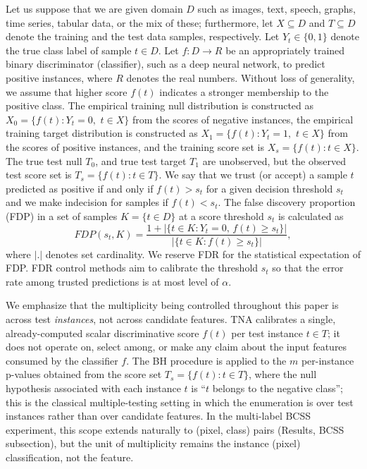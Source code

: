 \documentclass[10pt,letterpaper]{article}
\begin{document}
Let us suppose that we are given domain $D$ such as images, text, speech, graphs, time series, tabular data, or the mix of these; furthermore, let $X\subseteq D$ and $T\subseteq D$ denote the training and  the test data samples, respectively.
Let $Y_t\in\{0,1\}$ denote the true class label of sample $t\in D$.
Let $f:D\rightarrow R$ be an appropriately trained binary discriminator (classifier), such as a deep neural network, to predict positive instances, where $R$ denotes the real numbers.
Without loss of generality, we assume that higher score $f(t)$ indicates a stronger membership to the positive class.
The empirical training null distribution is constructed as $X_0=\{f(t):Y_t = 0,\,\,  t\in X\}$ from the scores of negative instances, the empirical training target distribution is constructed as $X_1=\{f(t): Y_t = 1,\,\,  t\in X\}$ from the scores of positive instances, and the training score set is $X_s=\{f(t): t\in X\}$.
The true test null $T_0$, and true test target $T_1$ are unobserved, but the observed test score set is $ T_s=\{f(t): t\in T\}$.
We say that we trust (or accept) a  sample $t$ predicted as positive if and only if $f(t)>s_t$ for a given decision threshold  $s_t$ and we make indecision for samples if $f(t) < s_t$.
The false discovery proportion (FDP) in a set of samples $K=\{t\in D\}$ at a score threshold $s_t$ is calculated as 
\begin{equation*}
	FDP(s_t,K)=\frac{1+|\{t\in K: Y_t=0,\,f(t)\ge s_t\}|}{|\{t\in K:f(t)\ge s_t\}|},
\end{equation*}
\noindent where $|.|$ denotes set cardinality.
We reserve FDR for the statistical expectation of FDP.
FDR control methods aim to calibrate the threshold  $s_t$ so that the error rate among trusted predictions is at most level of $\alpha$. 

We emphasize that the multiplicity being controlled throughout this paper is across test {\em instances}, not across candidate features. TNA calibrates a single, already-computed scalar discriminative score $f(t)$ per test instance $t\in T$; it does not operate on, select among, or make any claim about the input features consumed by the classifier $f$. The BH procedure is applied to the $m$ per-instance p-values obtained from the score set $T_s=\{f(t):t\in T\}$, where the null hypothesis associated with each instance $t$ is ``$t$ belongs to the negative class''; this is the classical multiple-testing setting in which the enumeration is over test instances rather than over candidate features. In the multi-label BCSS experiment, this scope extends naturally to (pixel, class) pairs (Results, BCSS subsection), but the unit of multiplicity remains the instance (pixel) classification, not the feature.
\end{document}
